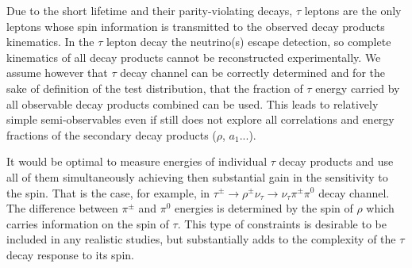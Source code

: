 \documentclass{article}
\begin{document}
Due to the short lifetime and their parity-violating decays, $\tau$
leptons are the only leptons whose spin information  
is transmitted to the observed decay products
kinematics. %
In the $\tau$ lepton decay the neutrino(s) escape detection, so complete kinematics of 
all decay products cannot be reconstructed experimentally. 
We assume however that $\tau$ decay channel can be correctly determined
and for the sake of definition of the test distribution,  that the fraction of $\tau$ energy carried 
by all observable decay products combined can be used. 
This leads to relatively simple semi-observables even if still does not explore all correlations
and energy fractions of the secondary decay products ($\rho$, $a_1$...). 

It would be optimal to measure energies of individual
$\tau$ decay products  and use all  of them simultaneously achieving then
substantial gain in the sensitivity to the spin.
That is the case, for example, in $\tau^\pm \to \rho^\pm \nu_\tau \to \nu_\tau \pi^\pm \pi^0$ decay channel.
The difference between $ \pi^\pm$ and $ \pi^0$ energies is determined by the spin of $\rho$ which 
carries information on the  spin of $\tau$.  
This type of constraints is desirable  to be included in any realistic studies, 
but substantially adds to the complexity of the $\tau$ decay response to its spin.  
\end{document}
